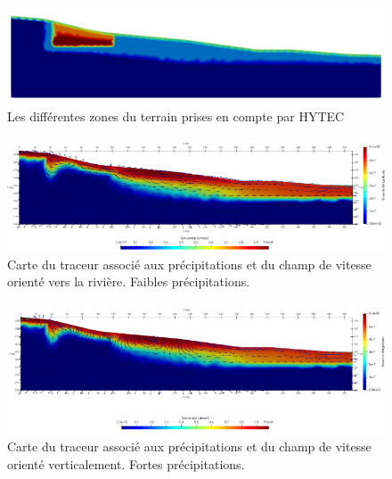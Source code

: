 \documentclass{article}
\begin{document}
\begin{figure}[H]
    \centering
    \includegraphics[width=\linewidth]{LJ-zones-HYTEC-final.png}
    \caption{Les différentes zones du terrain prises en compte par HYTEC}
    \label{fig:zones_HYTEC}
\end{figure}

\begin{figure}[H]
    \centering
    \includegraphics[width=\linewidth]{III_B_3_6.png}
    
    \caption{Carte du traceur associé aux précipitations et du champ de vitesse orienté vers la rivière. Faibles précipitations.}
    \label{fig:v_précipitations_ribiere_1}
\end{figure}
\label{page:evolution_champ_vitesse}
\begin{figure}[H]
    \centering
    \includegraphics[width=\linewidth]{III_B_3_7.png}
    
    \caption{Carte du traceur associé aux précipitations et du champ de vitesse orienté verticalement. Fortes précipitations.}
    \label{fig:v_précipitations_ribiere_2}
\end{figure}
\end{document}
